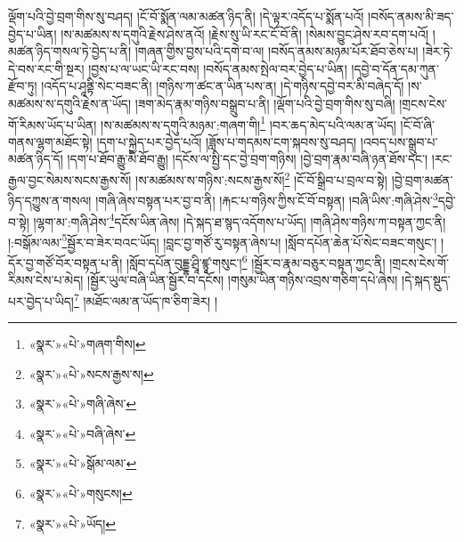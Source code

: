 ལྡོག་པའི་བྱེ་བྲག་གིས་སུ་བཤད། །ངོ་བོ་སྨོན་ལམ་མཚན་ཉིད་ནི། །དེ་ལྟར་འདོད་པ་སྨོན་པའོ། །བསོད་ནམས་མི་ཟད་བྱེད་པ་ཡིན། །ས་མཚམས་ས་དགུའི་རྗེས་ཤེས་ནའོ། །རྗེས་སུ་ཡི་རང་ངོ་བོ་ནི། །སེམས་བྱུང་ཤེས་རབ་དག་པའོ། །མཚན་ཉིད་གསལ་ཏེ་བྱེད་པ་ནི། །གཞན་གྱིས་བྱས་པའི་དགེ་བ་ལ། །བསོད་ནམས་མཉམ་པོར་ཐོབ་ཅེས་པ། །ཟེར་ཏེ་དེ་བས་རང་གི་སྔར། །བྱས་པ་ལ་ཡང་ཡི་རང་བས། །བསོད་ནམས་སྤེལ་བར་བྱེད་པ་ཡིན། །དབྱེ་བ་དོན་དམ་ཀུན་རྫོབ་ཏུ། །འདོད་པ་ཤཱནྟི་སེང་བཟང་ནི། །གཉིས་ཀ་ཚང་ན་ཡིན་པས་ན། །དེ་གཉིས་དབྱེ་བར་མི་བཞེད་དོ། །ས་མཚམས་ས་དགུའི་རྗེས་ན་ཡོད། །ཟག་མེད་རྣམ་གཉིས་བསྒྲུབ་པ་ནི། །ལྡོག་པའི་བྱེ་བྲག་གིས་སུ་བཞི། །གྲངས་ངེས་གོ་རིམས་ཡོད་པ་ཡིན། །ས་མཚམས་ས་དགུའི་མཉམ་:གཞག་གི།\footnote{«སྣར་»«པེ་»གཞག་གིས།} །བར་ཆད་མེད་པའི་ལམ་ན་ཡོད། །ངོ་བོ་ཞི་གནས་ལྷག་མཐོང་སྟེ། །དག་པ་སྐྱེད་པར་བྱེད་པའོ། །ཟློས་པ་གདམས་ངག་སྐབས་སུ་བཤད། །འབད་པས་སྒྲུབ་པ་མཚན་ཉིད་དོ། །དག་པ་ཐོབ་རྒྱུ་མི་ཐོབ་རྒྱུ། །དངོས་ལ་སྤྱི་དང་བྱེ་བྲག་གཉིས། །བྱེ་བྲག་རྣམ་བཞི་ཉན་ཐོས་དང་། །རང་རྒྱལ་བྱང་སེམས་སངས་རྒྱས་སོ། །ས་མཚམས་ས་གཉིས་:སངས་རྒྱས་སོ།\footnote{«སྣར་»«པེ་»སངས་རྒྱས་ས།} །ངོ་བོ་སྒྲིབ་པ་བྲལ་བ་སྟེ། །བྱེ་བྲག་མཚན་ཉིད་དཀྱུས་ན་གསལ། །གཞི་ཞེས་བསྟན་པར་བྱ་བ་ནི། །རྐང་པ་གཉིས་ཀྱིས་ངོ་བོ་བསྟན། །བཞི་ཡིས་:གཞི་ཤེས་\footnote{«སྣར་»«པེ་»གཞི་ཞེས་}དབྱེ་བ་སྟེ། །ལྷག་མ་:གཞི་ཤེས་\footnote{«སྣར་»«པེ་»བཞི་ཞེས་}དངོས་ཡིན་ཞེས། །དེ་སྐད་ཐ་སྙད་འདོགས་པ་ཡོད། །གཞི་ཤེས་གཉིས་ཀ་བསྟན་ཀྱང་ནི། །:བསྒོམ་ལམ་\footnote{«སྣར་»«པེ་»སྒོམ་ལམ་}སྦྱོར་བ་ཟེར་བའང་ཡོད། །བླང་བྱ་གཙོ་རུ་བསྟན་ཞེས་པ། །སློབ་དཔོན་ཆེན་པོ་སེང་བཟང་གསུང་། །དོར་བྱ་གཙོ་བོར་བསྟན་པ་ནི། །སློབ་དཔོན་བུདྡྷ་ཤྲཱི་ཛྙཱ་གསུང་།\footnote{«སྣར་»«པེ་»གསུངས།} །སྦྱོར་བ་རྣམ་བཅུར་བསྟན་ཀྱང་ནི། །གྲངས་ངེས་གོ་རིམས་ངེས་པ་མེད། །སྦྱོར་ཡུལ་བཞི་ཡིན་སྦྱོར་བ་དངོས། །གསུམ་ཡིན་གཉིས་འབྲས་གཅིག་དཔེ་ཞེས། །དེ་སྐད་སྡུད་པར་བྱེད་པ་ཡིད།\footnote{«སྣར་»«པེ་»ཡོད།} །མཐོང་ལམ་ན་ཡོད་ཁ་ཅིག་ཟེར། །
